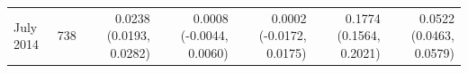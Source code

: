 \begin{tabular}{lrrrrrr}
July 2014 & 738 & 0.0238 (0.0193, 0.0282) & 0.0008 (-0.0044, 0.0060) & 0.0002 (-0.0172, 0.0175) & 0.1774 (0.1564, 0.2021) & 0.0522 (0.0463, 0.0579) \\

\end{tabular}
